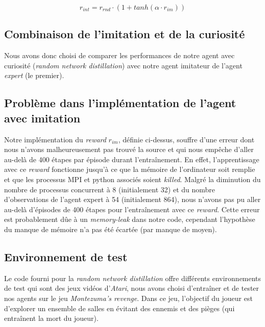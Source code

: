 \documentclass[a4paper,12pt]{report}
\begin{document}
\begin{equation} r_{int} = r_{rnd} \cdot (1 + tanh(\alpha \cdot r_{im})) \end{equation}

\subsection{Combinaison de l'imitation et de la curiosité}
Nous avons donc choisi de comparer les performances de notre agent avec curiosité (\textit{random network distillation}) avec notre agent imitateur de l'agent \textit{expert} (le premier).

\subsection{Problème dans l'implémentation de l'agent avec imitation}
\indent Notre implémentation du \textit{reward} $r_{im}$, définie ci-dessus, souffre d'une erreur dont nous n'avons malheureusement pas trouvé la source et qui nous empêche d'aller au-delà de 400 étapes par épisode durant l'entraînement.
En effet, l'apprentissage avec ce \textit{reward} fonctionne jusqu'à ce que la mémoire de l'ordinateur soit remplie et que les processus MPI et python associés soient \textit{killed}.
Malgré la diminution du nombre de processus concurrent à 8 (initialement 32) et du nombre d'observations de l'agent expert à 54 (initialement 864), nous n'avons pas pu aller au-delà d'épisodes de 400 étapes pour l'entraînement avec ce \textit{reward}. Cette erreur est probablement dûe à un \textit{memory-leak} dans notre code, cependant l'hypothèse du manque de mémoire n'a pas été écartée (par manque de moyen).

\subsection{Environnement de test}
Le code fourni pour la \textit{random network distillation} offre différents environnements de test qui sont des jeux vidéos d'\textit{Atari}, nous avons choisi d'entraîner et de tester nos agents sur le jeu \textit{Montezuma's revenge}\cite{montezuma}. Dans ce jeu, l'objectif du joueur est d'explorer un ensemble de salles en évitant des ennemis et des pièges (qui entraînent la mort du joueur).
\end{document}
